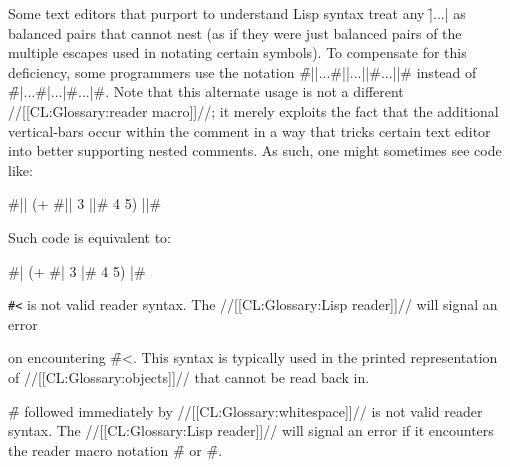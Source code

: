 \endsubsubsubsection%


Some text editors that purport to understand Lisp syntax treat any \f{|...|} as balanced pairs that cannot nest (as if they were just balanced pairs of  the multiple escapes used in notating certain symbols).  To compensate for  this deficiency, some programmers use the notation \f{\#||...\#||...||\#...||\#} instead of \f{\#|...\#|...|\#...|\#}.   Note that this alternate usage is not a different //[[CL:Glossary:reader macro]]//; it merely exploits the fact that the additional vertical-bars occur within the comment in a way that tricks certain text editor into better supporting nested comments.  As such, one might sometimes see code like:

\code
 #|| (+ #|| 3 ||# 4 5) ||#  \endcode

Such code is equivalent to:

\code
 #| (+ #| 3 |# 4 5) |# \endcode

\endsubsubsubsection%

\endsubsubsection%

  

{\tt  \#<} is not valid reader syntax. The //[[CL:Glossary:Lisp reader]]// will signal an error   

on encountering \f{\#<}. This syntax is typically used in the printed representation  of //[[CL:Glossary:objects]]// that cannot be read back in.  

\endsubsubsection%

 

\f{\#} followed immediately by //[[CL:Glossary:whitespace]]// is not valid reader syntax. The //[[CL:Glossary:Lisp reader]]// will signal an error  if it encounters the reader macro notation \f{\#\NewlineChar} or \f{\#\SpaceChar}.

\endsubsubsection%

 

